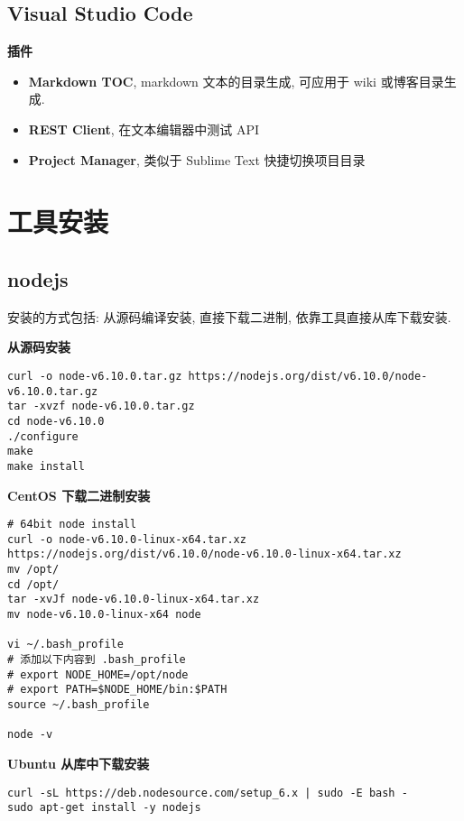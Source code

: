 \subsection{Visual Studio Code}\label{visual-studio-code}

\textbf{插件}

\begin{itemize}
\tightlist
\item
  \textbf{Markdown TOC}, markdown 文本的目录生成, 可应用于 wiki
  或博客目录生成.
\item
  \textbf{REST Client}, 在文本编辑器中测试 API
\item
  \textbf{Project Manager}, 类似于 Sublime Text 快捷切换项目目录
\end{itemize}

\section{工具安装}\label{ux5de5ux5177ux5b89ux88c5}

\subsection{nodejs}\label{nodejs}

安装的方式包括: 从源码编译安装, 直接下载二进制,
依靠工具直接从库下载安装.

\textbf{从源码安装}

\begin{lstlisting}
curl -o node-v6.10.0.tar.gz https://nodejs.org/dist/v6.10.0/node-v6.10.0.tar.gz
tar -xvzf node-v6.10.0.tar.gz
cd node-v6.10.0
./configure
make
make install
\end{lstlisting}

\textbf{CentOS 下载二进制安装}

\begin{lstlisting}
# 64bit node install
curl -o node-v6.10.0-linux-x64.tar.xz https://nodejs.org/dist/v6.10.0/node-v6.10.0-linux-x64.tar.xz
mv /opt/
cd /opt/
tar -xvJf node-v6.10.0-linux-x64.tar.xz
mv node-v6.10.0-linux-x64 node

vi ~/.bash_profile
# 添加以下内容到 .bash_profile
# export NODE_HOME=/opt/node
# export PATH=$NODE_HOME/bin:$PATH
source ~/.bash_profile

node -v
\end{lstlisting}

\textbf{Ubuntu 从库中下载安装}

\begin{lstlisting}
curl -sL https://deb.nodesource.com/setup_6.x | sudo -E bash -
sudo apt-get install -y nodejs
\end{lstlisting}

